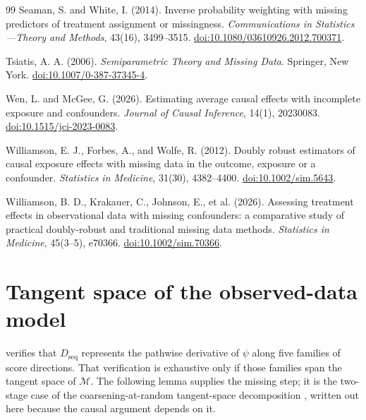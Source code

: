 \documentclass[11pt]{article}
\theoremstyle{definition}
\newcommand{\1}{\mathbf{1}}
\newcommand{\seq}{\mathrm{seq}}
\begin{document}
\begin{thebibliography}{99}
Seaman, S. and White, I. (2014).
Inverse probability weighting with missing predictors of treatment assignment or missingness.
\emph{Communications in Statistics---Theory and Methods}, 43(16), 3499--3515.
\href{https://doi.org/10.1080/03610926.2012.700371}{doi:10.1080/03610926.2012.700371}.

Tsiatis, A. A. (2006).
\emph{Semiparametric Theory and Missing Data}.
Springer, New York.
\href{https://doi.org/10.1007/0-387-37345-4}{doi:10.1007/0-387-37345-4}.

Wen, L. and McGee, G. (2026).
Estimating average causal effects with incomplete exposure and confounders.
\emph{Journal of Causal Inference}, 14(1), 20230083.
\href{https://doi.org/10.1515/jci-2023-0083}{doi:10.1515/jci-2023-0083}.

Williamson, E. J., Forbes, A., and Wolfe, R. (2012).
Doubly robust estimators of causal exposure effects with missing data in the outcome, exposure or a confounder.
\emph{Statistics in Medicine}, 31(30), 4382--4400.
\href{https://doi.org/10.1002/sim.5643}{doi:10.1002/sim.5643}.

Williamson, B. D., Krakauer, C., Johnson, E., et al. (2026).
Assessing treatment effects in observational data with missing confounders: a comparative study of practical doubly-robust and traditional missing data methods.
\emph{Statistics in Medicine}, 45(3--5), e70366.
\href{https://doi.org/10.1002/sim.70366}{doi:10.1002/sim.70366}.

\end{thebibliography}

\appendix
\clearpage
\section{Tangent space of the observed-data model}\label{app:tangent}

 verifies that $D_{\seq}$ represents the pathwise derivative of
$\psi$ along five families of score directions. That verification is exhaustive
only if those families span the tangent space of $\mathcal M$. The following
lemma supplies the missing step; it is the two-stage case of the
coarsening-at-random tangent-space decomposition
\citep{rrz1994,gill1997,tsiatis2006}, written out here because the causal
argument depends on it.
\end{document}
